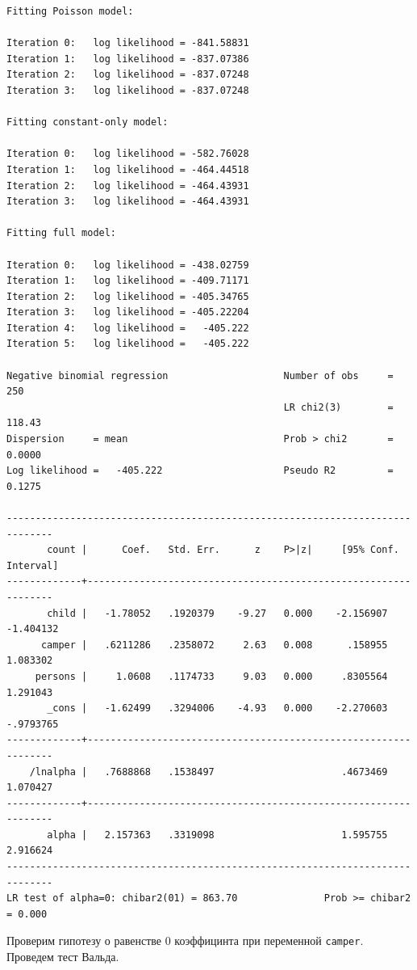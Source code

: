 \documentclass[]{book}
\begin{document}
\begin{verbatim}
Fitting Poisson model:

Iteration 0:   log likelihood = -841.58831  
Iteration 1:   log likelihood = -837.07386  
Iteration 2:   log likelihood = -837.07248  
Iteration 3:   log likelihood = -837.07248  

Fitting constant-only model:

Iteration 0:   log likelihood = -582.76028  
Iteration 1:   log likelihood = -464.44518  
Iteration 2:   log likelihood = -464.43931  
Iteration 3:   log likelihood = -464.43931  

Fitting full model:

Iteration 0:   log likelihood = -438.02759  
Iteration 1:   log likelihood = -409.71171  
Iteration 2:   log likelihood = -405.34765  
Iteration 3:   log likelihood = -405.22204  
Iteration 4:   log likelihood =   -405.222  
Iteration 5:   log likelihood =   -405.222  

Negative binomial regression                    Number of obs     =        250
                                                LR chi2(3)        =     118.43
Dispersion     = mean                           Prob > chi2       =     0.0000
Log likelihood =   -405.222                     Pseudo R2         =     0.1275

------------------------------------------------------------------------------
       count |      Coef.   Std. Err.      z    P>|z|     [95% Conf. Interval]
-------------+----------------------------------------------------------------
       child |   -1.78052   .1920379    -9.27   0.000    -2.156907   -1.404132
      camper |   .6211286   .2358072     2.63   0.008      .158955    1.083302
     persons |     1.0608   .1174733     9.03   0.000     .8305564    1.291043
       _cons |   -1.62499   .3294006    -4.93   0.000    -2.270603   -.9793765
-------------+----------------------------------------------------------------
    /lnalpha |   .7688868   .1538497                      .4673469    1.070427
-------------+----------------------------------------------------------------
       alpha |   2.157363   .3319098                      1.595755    2.916624
------------------------------------------------------------------------------
LR test of alpha=0: chibar2(01) = 863.70               Prob >= chibar2 = 0.000
\end{verbatim}

Проверим гипотезу о равенстве 0 коэффицинта при переменной \texttt{camper}. Проведем тест Вальда.
\end{document}
